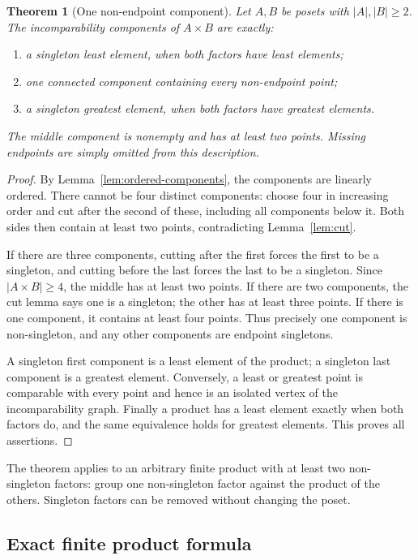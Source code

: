 \documentclass[11pt,letterpaper]{article}
\newtheorem{theorem}{Theorem}[section]
\theoremstyle{definition}
\theoremstyle{remark}
\begin{document}
\begin{theorem}[One non-endpoint component]\label{thm:product-components}
Let $A,B$ be posets with $|A|,|B|\ge2$. The incomparability components of
$A\times B$ are exactly:
\begin{enumerate}[label=(\roman*)]
\item a singleton least element, when both factors have least elements;
\item one connected component containing every non-endpoint point;
\item a singleton greatest element, when both factors have greatest elements.
\end{enumerate}
The middle component is nonempty and has at least two points. Missing
endpoints are simply omitted from this description.
\end{theorem}
\begin{proof}
By Lemma~\ref{lem:ordered-components}, the components are linearly ordered.
There cannot be four distinct components: choose four in increasing order
and cut after the second of these, including all components below it.
Both sides then contain at least two points, contradicting
Lemma~\ref{lem:cut}.

If there are three components, cutting after the first forces the first
to be a singleton, and cutting before the last forces the last to be a
singleton. Since $|A\times B|\ge4$, the middle has at least two points.
If there are two components, the cut lemma says one is a singleton;
the other has at least three points. If there is one component, it contains
at least four points. Thus precisely one component is non-singleton, and
any other components are endpoint singletons.

A singleton first component is a least element of the product; a singleton
last component is a greatest element. Conversely, a least or greatest
point is comparable with every point and hence is an isolated vertex of
the incomparability graph. Finally a product has a least element exactly
when both factors do, and the same equivalence holds for greatest
elements. This proves all assertions.
\end{proof}

The theorem applies to an arbitrary finite product with at least two
non-singleton factors: group one non-singleton factor against the product
of the others. Singleton factors can be removed without changing the
poset.

\subsection{Exact finite product formula}
\end{document}
